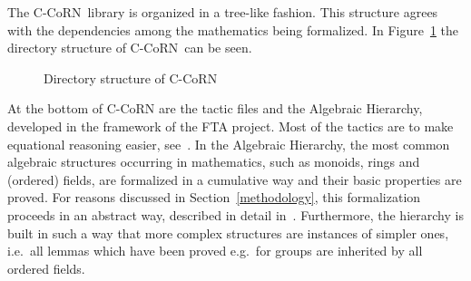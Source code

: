 \documentclass[runningheads]{llncs}
\newcommand{\ccorn}{\mbox{C-CoRN}}
\newcommand{\coq}{Coq}
\newcommand{\fta}{FTA}
\newcommand{\weg}[1]{}
\begin{document}
\weg{
A second reason for restricting to constructive proofs is that
intuitionistic logic is the natural language of the type theory on
which \coq\ is based; therefore it seems nicer to work without adding
extra axioms insofar this is feasible.  Also, adding the principle of
excluded middle to the present-day type theory of \coq\ is not
completely straightforward, as some intuitively obvious forms of it
turn out to be inconsistent.

Finally, all constructive reasoning remains valid when classical reasoning is
allowed; hence a constructive formalization will be, at least in principle,
accepted by a larger audience.
}

The \ccorn\ library is organized in a tree-like fashion.
This structure agrees with the dependencies among the mathematics being
formalized.
In Figure~\ref{fig:tree} the directory structure of \ccorn\ can be seen.
\begin{figure}
\hfill{}\hspace*{\fill}
\caption{Directory structure of \ccorn}
\label{fig:tree}
\end{figure}

At the bottom of {\ccorn} are the tactic files and the Algebraic
Hierarchy, developed in the framework of the {\fta} project. Most of the
tactics are to make equational reasoning easier,
see~\cite{geuvers2000}. In the Algebraic Hierarchy, the most common
algebraic structures occurring in mathematics, such as monoids, rings and
(ordered) fields, are formalized in a cumulative way and their basic
properties are proved.  For reasons discussed in
Section~\ref{methodology}, this formalization proceeds in an abstract
way, described in detail in~\cite{geuvers2002}.
Furthermore, the hierarchy is built in such a way that more
complex structures are instances of simpler ones, i.e.\ all
lemmas which have been proved e.g.\ for groups are inherited by all
ordered fields.
\end{document}
